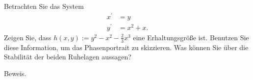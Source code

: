 \begin{exercise}
Betrachten Sie das System
\begin{align*}
  x^{\prime} &= y \\
  y^{\prime} &= x^2 + x.
\end{align*}
Zeigen Sie, dass $h(x,y) := y^2 - x^2 -\frac{2}{3}x^3$ eine Erhaltungsgröße ist.
Benutzen Sie diese Information, um das Phasenportrait zu skizzieren.
Was können Sie über die Stabilität der beiden Ruhelagen aussagen?
\end{exercise}
\begin{solution}
Beweis.
\end{solution}

